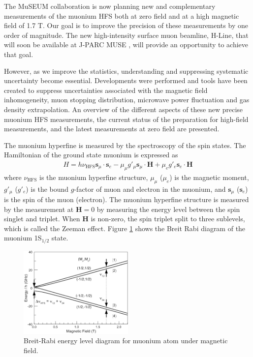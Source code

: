 The MuSEUM collaboration is now planning new and complementary
measurements of the muonium HFS both at zero field and at a high
magnetic field of 1.7 T.  Our goal is to improve the precision
of these measurements by one order of magnitude.  The new
high-intensity surface muon beamline, H-Line, that will soon be
available at J-PARC MUSE \cite{Higemoto:2017}, will provide
an opportunity to achieve that goal.

However, as we improve the statistics, understanding and suppressing
systematic uncertainty become essential.  Developments were performed
and tools have been created to suppress uncertainties associated
with the magnetic field inhomogeneity, muon stopping distribution,
microwave power fluctuation and gas density extrapolation.  An
overview of the different aspects of these new precise muonium
HFS measurements, the current status of the preparation for
high-field measurements, and the latest measurements at zero
field are presented.


The muonium hyperfine is measured by the spectroscopy of the
spin states.  The Hamiltonian of the ground state muonium is
expressed as
%
\begin{align}
 H  =    h \nu_{\text{HFS}} \mathbf{s}_\mu \cdot \mathbf{s}_e
      - \mu_\mu g'_\mu \mathbf{s}_\mu \cdot \mathbf{H} 
      + \mu_e g'_e \mathbf{s}_e \cdot \mathbf{H} 
\end{align}
%
where $\nu_{\text{HFS}}$ is the muonium hyperfine structure,
$\mu_\mu$ ($\mu_e$) is the magnetic moment, $g'_\mu$ ($g'_e$)
is the bound $g$-factor of muon and electron in the muonium,
and $\mathbf{s}_\mu$ ($\mathbf{s}_e$) is the spin of the muon
(electron).  The muonium hyperfine structure is measured by
the measurement at $\mathbf{H}=0$ by measuring the energy level
between the spin singlet and triplet.  When $\mathbf{H}$
is non-zero, the spin triplet split to three sublevels, which
is called the Zeeman effect.  Figure \ref{fig:BreitRabi} shows
the Breit Rabi diagram of the muonium 1S$_{1/2}$ state.

\begin{figure}[th]
 \centering
 \includegraphics[width=0.5\textwidth, bb= 0 0 227 181]
                 {./Fig/MuHFS-BreitRabi.png}
\caption{\label{fig:BreitRabi}
Breit-Rabi energy level diagram for muonium atom under magnetic field.}
\end{figure}

